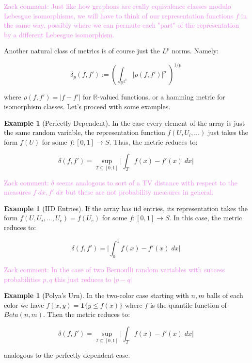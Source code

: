 \documentclass[11pt,oneside,reqno]{article}
\theoremstyle{plain}
\theoremstyle{definition}
\newtheorem{example}[theorem]{Example}
\numberwithin{equation}{section}
\renewcommand{\leq}{\leqslant}
\newcommand{\R}{\mathbb{R}}
\newcommand{\ind}{\mathbf{1}}
\newcommand{\zack}[1]{\textcolor{Violet}{Zack comment: #1}}
\begin{document}
\zack{Just like how graphons are really equivalence classes modulo Lebesgue isomorphisms, we will have to think of our representation functions $f$ in the same way, possibly where we can permute each "part" of the representation by a different Lebesgue isomorphism. }


\noindent Another natural class of metrics is of course just the $L^p$ norms. Namely:

\[\delta_p(f,f') := \left(\int_{\R^{2^k}} |\rho(f,f')|^p \; \right)^{1/p} \]

\noindent where $\rho(f,f') = |f-f'|$ for $\R$-valued functions, or a hamming metric for isomorphism classes. Let's proceed with some examples.


\begin{example}[Perfectly Dependent]
In the case every element of the array is just the same random variable, the representation function $f(U, U_i,...)$ just takes the form $f(U)$ for some $f : [0,1] \to S$. Thus, the metric reduces to:

\[\delta(f,f') =  \sup_{T \subseteq [0,1]} \bigg| \int_T f(x) -  f'(x) \; dx \bigg| \]

\zack{$\delta$ seems analogous to sort of a TV distance with respect to the measures $f \; dx, f' \; dx$ but these are not probability measures in general.}
\end{example}


\begin{example}[IID Entries]
If the array has iid entries, its representation takes the form $f(U, U_i,... , U_e) = f(U_e)$ for some $f:[0,1] \to S$. In this case, the metric reduces to:

\[\delta(f,f') =  \bigg| \int_0^1 f(x) - f'(x) \; dx \bigg| \]

\zack{In the case of two Bernoulli random variables with success probabilities $p,q$ this just reduces to $|p-q|$}
\end{example}

\begin{example}[Polya's Urn]
In the two-color case starting with $n,m$ balls of each color we have $f(x,y) = \ind \{y \leq f(x)\}$ where $f$ is the quantile function of $Beta(n,m)$. Then the metric reduces to:

\[\delta(f,f') =  \sup_{T \subseteq [0,1]} \bigg| \int_T f(x) -  f'(x) \; dx \bigg| \]

\noindent analogous to the perfectly dependent case.\\
\end{example}
\end{document}
